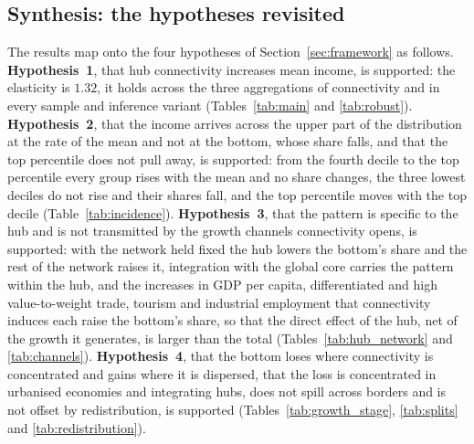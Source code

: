 \subsection{Synthesis: the hypotheses revisited}
\label{sec:synthesis}
The results map onto the four hypotheses of Section~\ref{sec:framework} as follows. \textbf{Hypothesis~1}, that hub connectivity increases mean income, is supported: the elasticity is $1.32$, it holds across the three aggregations of connectivity and in every sample and inference variant (Tables~\ref{tab:main} and \ref{tab:robust}). \textbf{Hypothesis~2}, that the income arrives across the upper part of the distribution at the rate of the mean and not at the bottom, whose share falls, and that the top percentile does not pull away, is supported: from the fourth decile to the top percentile every group rises with the mean and no share changes, the three lowest deciles do not rise and their shares fall, and the top percentile moves with the top decile (Table~\ref{tab:incidence}). \textbf{Hypothesis~3}, that the pattern is specific to the hub and is not transmitted by the growth channels connectivity opens, is supported: with the network held fixed the hub lowers the bottom's share and the rest of the network raises it, integration with the global core carries the pattern within the hub, and the increases in GDP per capita, differentiated and high value-to-weight trade, tourism and industrial employment that connectivity induces each raise the bottom's share, so that the direct effect of the hub, net of the growth it generates, is larger than the total (Tables~\ref{tab:hub_network} and \ref{tab:channels}). \textbf{Hypothesis~4}, that the bottom loses where connectivity is concentrated and gains where it is dispersed, that the loss is concentrated in urbanised economies and integrating hubs, does not spill across borders and is not offset by redistribution, is supported (Tables~\ref{tab:growth_stage}, \ref{tab:splits} and \ref{tab:redistribution}).

